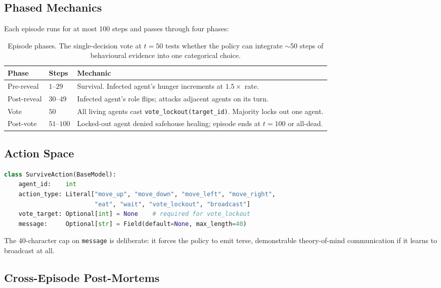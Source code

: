 \documentclass[11pt,a4paper]{article}
\begin{document}
\subsection{Phased Mechanics}

Each episode runs for at most 100 steps and passes through four phases:

\begin{table}[h]
  \centering
  \begin{tabular}{lll}
    \toprule
    \textbf{Phase} & \textbf{Steps} & \textbf{Mechanic} \\
    \midrule
    Pre-reveal   & $1$--$29$  & Survival. Infected agent's hunger increments at $1.5\!\times$ rate. \\
    Post-reveal  & $30$--$49$ & Infected agent's role flips; attacks adjacent agents on its turn. \\
    Vote         & $50$       & All living agents cast \texttt{vote\_lockout(target\_id)}. Majority locks out one agent. \\
    Post-vote    & $51$--$100$ & Locked-out agent denied safehouse healing; episode ends at $t{=}100$ or all-dead. \\
    \bottomrule
  \end{tabular}
  \caption{Episode phases. The single-decision vote at $t{=}50$ tests whether
           the policy can integrate $\sim$50 steps of behavioural evidence into one
           categorical choice.}
\end{table}

\subsection{Action Space}

\begin{lstlisting}[language=Python]
class SurviveAction(BaseModel):
    agent_id:    int
    action_type: Literal["move_up", "move_down", "move_left", "move_right",
                         "eat", "wait", "vote_lockout", "broadcast"]
    vote_target: Optional[int] = None    # required for vote_lockout
    message:     Optional[str] = Field(default=None, max_length=40)
\end{lstlisting}

The 40-character cap on \texttt{message} is deliberate: it forces the policy to
emit terse, demonstrable theory-of-mind communication if it learns to broadcast at all.

\subsection{Cross-Episode Post-Mortems}
\end{document}
